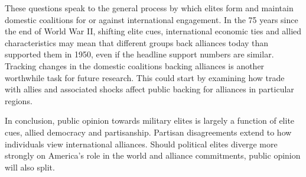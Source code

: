 \documentclass[12pt]{article}
\begin{document}
These questions speak to the general process by which elites form and maintain domestic coalitions for or against international engagement. 
In the 75 years since the end of World War II, shifting elite cues, international economic ties and allied characteristics may mean that different groups back alliances today than supported them in 1950, even if the headline support numbers are similar. 
Tracking changes in the domestic coalitions backing alliances is another worthwhile task for future research.
This could start by examining how trade with allies and associated shocks affect public backing for alliances in particular regions. 


In conclusion, public opinion towards military elites is largely a function of elite cues, allied democracy and partisanship.  
Partisan disagreements extend to how individuals view international alliances.
Should political elites diverge more strongly on America's role in the world and alliance commitments, public opinion will also split. 



\newpage

 
 
\end{document}
